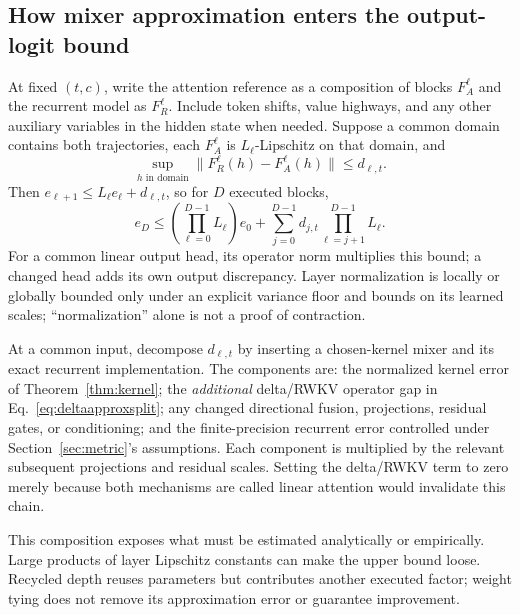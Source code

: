 \documentclass{article}
\theoremstyle{remark}\newtheorem{remark}[theorem]{Remark}
\begin{document}
\subsection{How mixer approximation enters the output-logit bound}
At fixed $(t,c)$, write the attention reference as a composition of blocks $F_A^\ell$ and the recurrent model as $F_R^\ell$. Include token shifts, value highways, and any other auxiliary variables in the hidden state when needed. Suppose a common domain contains both trajectories, each $F_A^\ell$ is $L_\ell$-Lipschitz on that domain, and
\begin{equation}
 \sup_{h\text{ in domain}}\|F_R^\ell(h)-F_A^\ell(h)\|\le d_{\ell,t}.
\end{equation}
Then $e_{\ell+1}\le L_\ell e_\ell+d_{\ell,t}$, so for $D$ executed blocks,
\begin{equation}
 e_D\le\left(\prod_{\ell=0}^{D-1}L_\ell\right)e_0+
 \sum_{j=0}^{D-1}d_{j,t}\prod_{\ell=j+1}^{D-1}L_\ell.
 \label{eq:layercomposition}
\end{equation}
For a common linear output head, its operator norm multiplies this bound; a changed head adds its own output discrepancy. Layer normalization is locally or globally bounded only under an explicit variance floor and bounds on its learned scales; ``normalization'' alone is not a proof of contraction.

At a common input, decompose $d_{\ell,t}$ by inserting a chosen-kernel mixer and its exact recurrent implementation. The components are: the normalized kernel error of Theorem~\ref{thm:kernel}; the \emph{additional} delta/RWKV operator gap in Eq.~\eqref{eq:deltaapproxsplit}; any changed directional fusion, projections, residual gates, or conditioning; and the finite-precision recurrent error controlled under Section~\ref{sec:metric}'s assumptions. Each component is multiplied by the relevant subsequent projections and residual scales. Setting the delta/RWKV term to zero merely because both mechanisms are called linear attention would invalidate this chain.

This composition exposes what must be estimated analytically or empirically. Large products of layer Lipschitz constants can make the upper bound loose. Recycled depth reuses parameters but contributes another executed factor; weight tying does not remove its approximation error or guarantee improvement.
\end{document}
